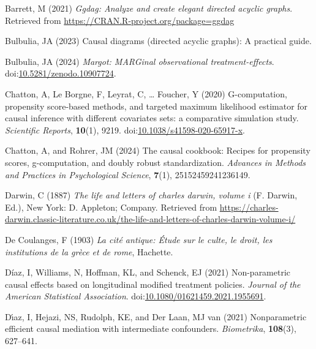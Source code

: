 \documentclass[
  single column]{article}
\newlength{\cslhangindent}
\newenvironment{CSLReferences}[2] %
 {\begin{list}{}{%
  \setlength{\itemindent}{0pt}
  \setlength{\leftmargin}{0pt}
  \setlength{\parsep}{0pt}
  \ifodd #1
   \setlength{\leftmargin}{\cslhangindent}
   \setlength{\itemindent}{-1\cslhangindent}
  \fi
  \setlength{\itemsep}{#2\baselineskip}}}
 {\end{list}}
\begin{document}
\label{refs}
\begin{CSLReferences}{1}{0}
Barrett, M (2021) \emph{Ggdag: Analyze and create elegant directed
acyclic graphs}. Retrieved from
\url{https://CRAN.R-project.org/package=ggdag}

Bulbulia, JA (2023) Causal diagrams (directed acyclic graphs): A
practical guide.

Bulbulia, JA (2024) \emph{Margot: MARGinal observational
treatment-effects}.
doi:\href{https://doi.org/10.5281/zenodo.10907724}{10.5281/zenodo.10907724}.

Chatton, A, Le Borgne, F, Leyrat, C, \ldots{} Foucher, Y (2020)
G-computation, propensity score-based methods, and targeted maximum
likelihood estimator for causal inference with different covariates
sets: a comparative simulation study. \emph{Scientific Reports},
\textbf{10}(1), 9219.
doi:\href{https://doi.org/10.1038/s41598-020-65917-x}{10.1038/s41598-020-65917-x}.

Chatton, A, and Rohrer, JM (2024) The causal cookbook: Recipes for
propensity scores, g-computation, and doubly robust standardization.
\emph{Advances in Methods and Practices in Psychological Science},
\textbf{7}(1), 25152459241236149.

Darwin, C (1887) \emph{The life and letters of charles darwin, volume i}
(F. Darwin, Ed.), New York: D. Appleton; Company. Retrieved from
\url{https://charles-darwin.classic-literature.co.uk/the-life-and-letters-of-charles-darwin-volume-i/}

De Coulanges, F (1903) \emph{La cité antique: Étude sur le culte, le
droit, les institutions de la grèce et de rome}, Hachette.

Díaz, I, Williams, N, Hoffman, KL, and Schenck, EJ (2021) Non-parametric
causal effects based on longitudinal modified treatment policies.
\emph{Journal of the American Statistical Association}.
doi:\href{https://doi.org/10.1080/01621459.2021.1955691}{10.1080/01621459.2021.1955691}.

Dı́az, I, Hejazi, NS, Rudolph, KE, and Der Laan, MJ van (2021)
Nonparametric efficient causal mediation with intermediate confounders.
\emph{Biometrika}, \textbf{108}(3), 627--641.


\end{CSLReferences}
\end{document}

